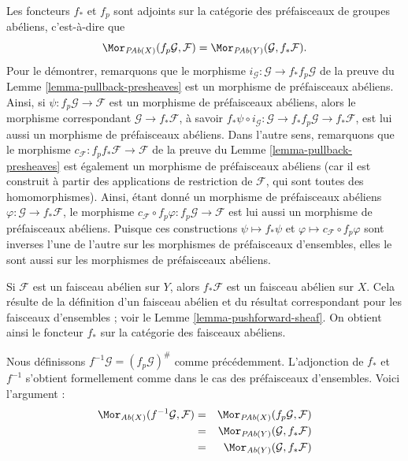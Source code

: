 \medskip\noindent
Les foncteurs $f_*$ et $f_p$ sont adjoints sur la
catégorie des préfaisceaux de groupes abéliens, c'est-à-dire que
$$
\Mor_{\textit{PAb}(X)}(f_p\mathcal{G}, \mathcal{F})
=
\Mor_{\textit{PAb}(Y)}(\mathcal{G}, f_*\mathcal{F}).
$$
Pour le démontrer, remarquons que le morphisme
$i_\mathcal{G} : \mathcal{G} \to f_* f_p\mathcal{G}$ de la preuve
du Lemme \ref{lemma-pullback-presheaves}
est un morphisme de préfaisceaux abéliens. Ainsi, si
$\psi : f_p\mathcal{G} \to \mathcal{F}$
est un morphisme de préfaisceaux abéliens, alors le morphisme correspondant
$\mathcal{G} \to f_*\mathcal{F}$, à savoir
$f_*\psi \circ i_\mathcal{G} :
\mathcal{G} \to f_* f_p \mathcal{G} \to f_* \mathcal{F}$,
est lui aussi un morphisme de préfaisceaux abéliens. Dans l'autre sens,
remarquons que le morphisme
$c_\mathcal{F} : f_p f_* \mathcal{F} \to \mathcal{F}$
de la preuve du Lemme \ref{lemma-pullback-presheaves} est également un
morphisme de préfaisceaux abéliens (car il est construit à partir des applications
de restriction de $\mathcal{F}$, qui sont toutes des homomorphismes). Ainsi,
étant donné un morphisme de préfaisceaux abéliens $\varphi : \mathcal{G} \to f_*\mathcal{F}$,
le morphisme
$c_\mathcal{F} \circ f_p\varphi : f_p\mathcal{G} \to \mathcal{F}$
est lui aussi un morphisme de préfaisceaux abéliens. Puisque ces constructions
$\psi \mapsto f_*\psi$ et $\varphi \mapsto c_\mathcal{F} \circ f_p\varphi$
sont inverses l'une de l'autre sur les morphismes de préfaisceaux d'ensembles,
elles le sont aussi sur les morphismes de préfaisceaux abéliens.

\medskip\noindent
Si $\mathcal{F}$ est un faisceau abélien sur $Y$, alors $f_*\mathcal{F}$
est un faisceau abélien sur $X$. Cela résulte de la définition
d'un faisceau abélien et du résultat correspondant pour les faisceaux d'ensembles ;
voir le Lemme \ref{lemma-pushforward-sheaf}. On obtient ainsi le foncteur
$f_*$ sur la catégorie des faisceaux abéliens.

\medskip\noindent
Nous définissons $f^{-1}\mathcal{G} = (f_p\mathcal{G})^\#$ comme précédemment.
L'adjonction de $f_*$ et $f^{-1}$ s'obtient formellement comme dans
le cas des préfaisceaux d'ensembles. Voici l'argument :
\begin{eqnarray*}
\Mor_{\textit{Ab}(X)}(f^{-1}\mathcal{G}, \mathcal{F})
& = &
\Mor_{\textit{PAb}(X)}(f_p\mathcal{G}, \mathcal{F}) \\
& = &
\Mor_{\textit{PAb}(Y)}(\mathcal{G}, f_*\mathcal{F}) \\
& = &
\Mor_{\textit{Ab}(Y)}(\mathcal{G}, f_*\mathcal{F})
\end{eqnarray*}

